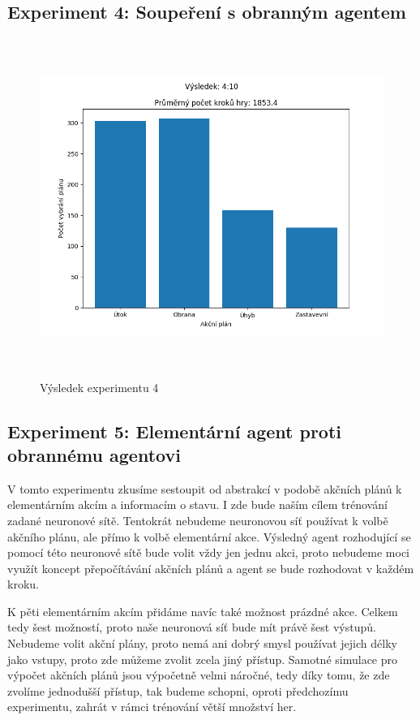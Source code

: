 \subsection{Experiment 4: Soupeření s obranným agentem}
\begin{figure}[p]\centering
\includegraphics[width=145mm, height=110mm]{./Obrazky/Experiment04Results.png}
\caption{Výsledek experimentu 4}
\label{obr06:Výsledek experimentu 04}
\end{figure}

\subsection{Experiment 5: Elementární agent proti obrannému agentovi}
V tomto experimentu zkusíme sestoupit od abstrakcí v podobě akčních plánů k elementárním akcím a informacím o stavu.
I zde bude naším cílem trénování zadané neuronové sítě.
Tentokrát nebudeme neuronovou síť používat k volbě akčního plánu, ale přímo k volbě elementární akce.
Výsledný agent rozhodující se pomocí této neuronové sítě bude volit vždy jen jednu akci, proto nebudeme moci využít koncept přepočítávání akčních plánů a agent se bude rozhodovat v každém kroku.

\par
K pěti elementárním akcím přidáme navíc také možnost prázdné akce. Celkem tedy šest možností, proto naše neuronová síť bude mít právě šest výstupů.
Nebudeme volit akční plány, proto nemá ani dobrý smysl používat jejich délky jako vstupy, proto zde můžeme zvolit zcela jiný přístup.
Samotné simulace pro výpočet akčních plánů jsou výpočetně velmi náročné, tedy díky tomu, že zde zvolíme jednodušší přístup, tak budeme schopni, oproti předchozímu experimentu, zahrát v rámci trénování větší množství her.

